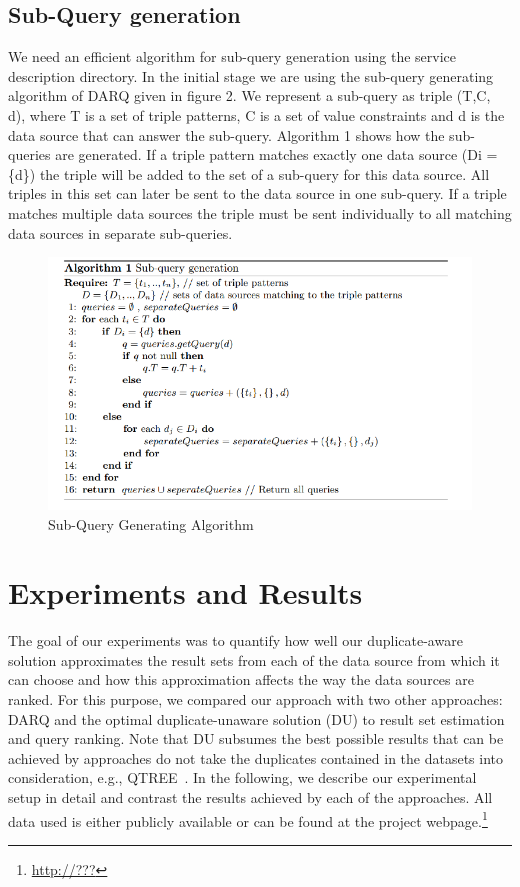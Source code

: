 \documentclass{sig-alternate}  %
\begin{document}
\subsection{Sub-Query generation}
We need an efficient algorithm for sub-query generation using the
service description directory. In the initial stage we are using the
sub-query generating algorithm of DARQ given in figure 2. We represent
a sub-query as triple (T,C, d), where T is a set of triple patterns,
C is a set of value constraints and d is the data source that can
answer the sub-query. Algorithm 1 shows how the sub-queries are generated.
If a triple pattern matches exactly one data source (Di
= \{d\}) the triple will be added to the set of a sub-query for this
data source. All triples in this set can later be sent to the data
source in one sub-query. If a triple matches multiple data sources
the triple must be sent individually to all matching data sources
in separate sub-queries.
\begin{figure}
\begin{centering}
\includegraphics[scale=0.7]{Algo1} 
\par\end{centering}
\caption{Sub-Query Generating Algorithm}
\end{figure}

\section{Experiments and Results}
The goal of our experiments was to quantify how well our duplicate-aware solution approximates the result sets from each of the data source from which it can choose and how this approximation affects the way the data sources are ranked.
For this purpose, we compared our approach with two other approaches: DARQ and the optimal duplicate-unaware solution (DU) to result set estimation and query ranking.
Note that DU subsumes the best possible results that  can be achieved by approaches do not take the duplicates contained in the datasets into consideration, e.g., QTREE~\cite{QTREE}. 
In the following, we describe our experimental setup in detail and contrast the results achieved by each of the approaches.
All data used is either publicly available or can be found at the project webpage.\footnote{\url{http://???}}
\end{document}
